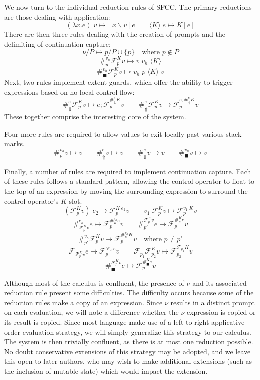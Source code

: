 \documentclass[11pt]{article}
\newcommand\x{\lambda x}
\newcommand\F{\mathcal{F}}
\newcommand{\angles}[1]{\langle#1\rangle}
\begin{document}
We now turn to the individual reduction rules of SFCC.
The primary reductions are those dealing with application:
$$(\x.e)\;v \mapsto [x \backslash v]e \qquad
  \angles{K}\;e \mapsto K[e]$$
There are then three rules dealing with the creation of prompts and the delimiting of continuation capture:
$$\nu/P \mapsto p/P\cup\{p\} \quad\textrm{where }p \notin P$$
$$\#_p^{v_h}\F_p^Kv \mapsto v\;v_h\;\angles K$$
$$\#_\blacksquare^{v_h}\F_p^K v \mapsto v_h\;p\;\angles{K}\;v$$
Next, two rules implement extent guards, which offer the ability to trigger expressions based on no-local control flow:
$$\#_{\Downarrow}^{e}\F_p^K v \mapsto e;\F_p^{\#_\Downarrow^{e}K}v \qquad
  \#_{\Uparrow}^{e}\F_p^K v \mapsto \F_p^{e;\#_\Uparrow^{e}K}v$$
These together comprise the interesting core of the system.

Four more rules are required to allow values to exit locally past various stack marks.
$$\#_p^{v_h} v \mapsto v \qquad
  \#_{\Uparrow}^{e}v \mapsto v \qquad
  \#_{\Downarrow}^{e}v \mapsto v \qquad
  \#_\blacksquare^{v_h}v \mapsto v$$

Finally, a number of rules are required to implement continuation capture.
Each of these rules follows a standard pattern, allowing the control operator to float to the top of an expression by moving the surrounding expression to surround the control operator's $K$ slot.
$$(\F^K_pv)\;e_2 \mapsto \F^{K\;e_2}_pv \qquad
  v_1\;\F^K_pv \mapsto \F^{v_1\;K}_pv$$
$$\#_{\F_p^Kv}^{e_h}e \mapsto \F_p^{\#_K^{e_h}e}v \qquad
  \#^{\F_p^Kv}_{p'}e \mapsto \F_p^{\#^K_{p'}e}v$$
$$\#_{p'}^{v_h}\F^K_pv \mapsto \F^{\#_{p'}^{v_h}K}_pv
  	\quad\textrm{where }p \neq p'$$
$$\F_{\F^K_pv}e \mapsto \F^{\F_Ke}_pv \qquad
  \F_{p_1}\F^K_{p_2}v \mapsto \F^{\F_{p_1}K}_{p_2}v$$
$$\#_\blacksquare^{\F_p^K v}e \mapsto \F_p^{\#_\blacksquare^K e}v$$

Although most of the calculus is confluent, the presence of $\nu$ and its associated reduction rule present some difficulties.
The difficulty occurs because some of the reduction rules make a copy of an expression.
Since $\nu$ results in a distinct prompt on each evaluation, we will note a difference whether the $\nu$ expression is copied or its result is copied.
Since most language make use of a left-to-right applicative order evaluation strategy, we will simply generalize this strategy to our calculus.
The system is then trivially confluent, as there is at most one reduction possible.
No doubt conservative extensions of this strategy may be adopted, and we leave this open to later authors, who may wish to make additional extensions (such as the inclusion of mutable state) which would impact the extension.
\end{document}
